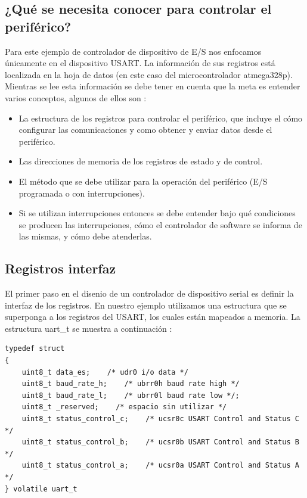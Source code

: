 \documentclass[output=paper, 
colorlinks,
citecolor=brown,
newtxmath
]{langscibook}
\begin{document}
\subsection*{¿Qué se necesita conocer para controlar el periférico?}
Para este ejemplo de controlador de dispositivo de E/S nos enfocamos únicamente
en el dispositivo USART. La información de sus registros está localizada en la hoja
de datos (en este caso del microcontrolador atmega328p). Mientras se lee esta información
se debe tener en cuenta que la meta es entender varios conceptos, algunos
de ellos son :
\begin{itemize}
\item La estructura de los registros para controlar el periférico, que incluye
el cómo configurar las comunicaciones y como obtener y enviar
datos desde el periférico.
\item Las direcciones de memoria de los registros de estado y de control.
\item El método que se debe utilizar para la operación del periférico (E/S 
programada o con interrupciones).
\item Si se utilizan interrupciones entonces se debe entender bajo qué condiciones
se producen las interrupciones, cómo el controlador de software se informa
de las mismas, y cómo debe atenderlas.
\end{itemize}

\subsection {Registros interfaz}

El primer paso en el disenio de un controlador de dispositivo serial es definir
la interfaz de los registros. En nuestro ejemplo utilizamos
una estructura que se superponga a los registros del USART, los cuales
están mapeados a memoria. La estructura uart\_t se muestra a continuación :


\begin{small}
\begin{verbatim}
typedef struct 
{
    uint8_t data_es;	/* udr0 i/o data */
    uint8_t baud_rate_h;    /* ubrr0h baud rate high */
    uint8_t baud_rate_l;    /* ubrr0l baud rate low */;
    uint8_t _reserved;    /* espacio sin utilizar */
    uint8_t status_control_c;    /* ucsr0c USART Control and Status C */
    uint8_t status_control_b;    /* ucsr0b USART Control and Status B */
    uint8_t status_control_a;    /* ucsr0a USART Control and Status A */
} volatile uart_t
\end{verbatim}
\end{small}
\end{document}
